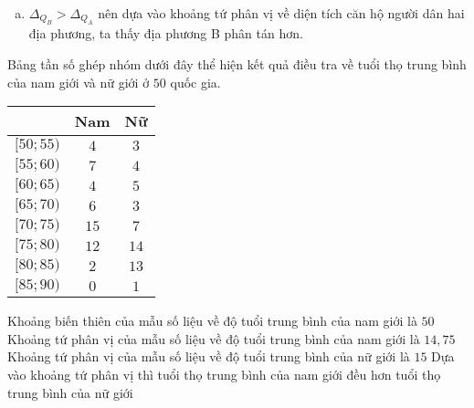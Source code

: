\begin{ex}
{\begin{enumerate}[a)]
			\begin{itemize}
				\item [$\bullet$] Nhóm chứa $Q_1^B$ là $[60 ; 70)$. Suy ra
						$$Q_1^B=60+\dfrac{25 -15}{20} \cdot 10=65.$$
				\item [$\bullet$] Nhóm chứa $Q_3^B$ là $[80;90)$.Suy ra
					$$Q_3^B=80+\dfrac{75 -65}{20} \cdot 10= 85.$$
			\end{itemize}
			Vậy khoảng tứ phân vị  ghép nhóm diện tích căn hộ của địa phương B là là $\Delta_{Q_B} =85-65=20$. 
			\item $\Delta_{Q_B}>\Delta_{Q_A}$ nên dựa vào khoảng tứ phân vị về diện tích căn hộ người dân hai địa phương, ta thấy địa phương B phân tán hơn.
		\end{enumerate}
	}
\end{ex}
\begin{ex}%
	Bảng tần số ghép nhóm dưới đây thể hiện kết quả điều tra về tuổi thọ trung bình của nam giới và nữ giới ở $50$ quốc gia.
	\begin{center}
		\begin{tabular}{|c|c|c|}
			\hline
			\diagbox{Nhóm (Tuổi thọ)}{Giới tính} & Nam & Nữ \\
			\hline
			$[50;55)$ & $4$ & $3$ \\
			\hline
			$[55;60)$ & $7$ & $4$ \\
			\hline
			$[60;65)$ & $4$ & $5$ \\
			\hline
			$[65;70)$ & $6$ & $3$ \\
			\hline
			$[70;75)$ & $15$ & $7$ \\
			\hline
			$[75;80)$ & $12$ & $14$ \\
			\hline
			$[80;85)$ & $2$ & $13$ \\
			\hline
			$[85;90)$ & $0$ & $1$ \\
			\hline	
		\end{tabular}
	\end{center}
	\choiceTF
	{Khoảng biến thiên của mẫu số liệu về độ tuổi trung bình của nam giới là $50$}
	{Khoảng tứ phân vị của mẫu số liệu về độ tuổi trung bình của nam giới là $14{,}75$}
	{Khoảng tứ phân vị của mẫu số liệu về độ tuổi trung bình của nữ giới là $15$}
	{\True Dựa vào khoảng tứ phân vị thì tuổi thọ trung bình của nam giới đều hơn tuổi thọ trung bình của nữ giới}
\end{ex}
